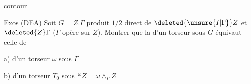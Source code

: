contour

\uline{Exos} (DEA) Soit $G=Z.\Gamma$ produit $1/2$ direct de $\deleted{\unsure{I|\Gamma}}Z$ et $\deleted{Z}\Gamma$ ($\Gamma$ opère sur $Z$). Montrer que la  d'un torseur  sous $G$ équivaut  celle de

a) d'un torseur $\omega$ sous $\Gamma$

b) d'un torseur $T_0$ sous $\,{}^\omega Z=\omega\wedge_\Gamma Z$

